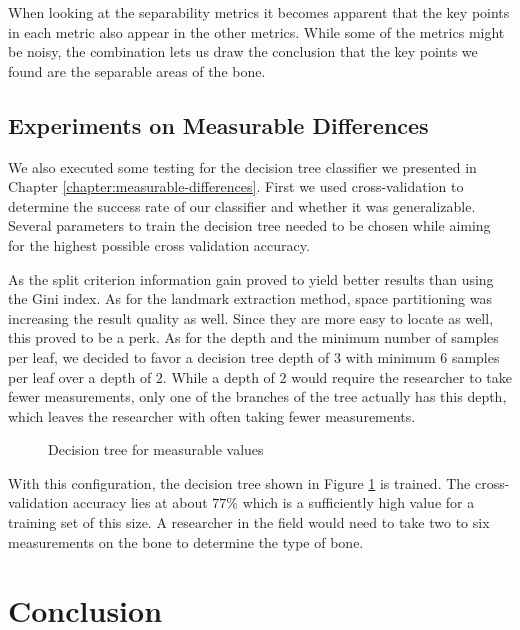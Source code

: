\documentclass[pdftex,12pt,a4paper]{report}
\begin{document}
When looking at the separability metrics it becomes apparent that the key points in each metric also appear in the other metrics. While some of the metrics might be noisy, the combination lets us draw the conclusion that the key points we found are the separable areas of the bone.

\section{Experiments on Measurable Differences}

We also executed some testing for the decision tree classifier we presented in Chapter \ref{chapter:measurable-differences}. First we used cross-validation to determine the success rate of our classifier and whether it was generalizable. Several parameters to train the decision tree needed to be chosen while aiming for the highest possible cross validation accuracy.

As the split criterion information gain proved to yield better results than using the Gini index. As for the landmark extraction method, space partitioning was increasing the result quality as well. Since they are more easy to locate as well, this proved to be a perk. As for the depth and the minimum number of samples per leaf, we decided to favor a decision tree depth of $3$ with minimum $6$ samples per leaf over a depth of $2$. While a depth of $2$ would require the researcher to take fewer measurements, only one of the branches of the tree actually has this depth, which leaves the researcher with often taking fewer measurements.

\begin{figure}[h]
	\centering
	\begin{subfigure}[b]{0.9\textwidth}
		\centering
		
	\end{subfigure}
	\caption{Decision tree for measurable values}
	\label{fig:result-decision-tree}
\end{figure}

With this configuration, the decision tree shown in Figure \ref{fig:result-decision-tree} is trained. The cross-validation accuracy lies at about $77\%$ which is a sufficiently high value for a training set of this size. A researcher in the field would need to take two to six measurements on the bone to determine the type of bone.

\chapter{Conclusion}
\end{document}
